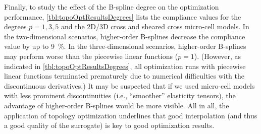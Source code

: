 Finally, to study the effect of the B-spline degree on the
optimization performance,
\cref{tbl:topoOptResultsDegrees} lists the compliance values
for the degrees $p = 1, 3, 5$ and the 2D/3D cross and sheared cross
micro-cell models.
In the two-dimensional scenarios,
higher-order B-splines decrease the compliance value
by up to \SI{9}{\percent}.
In the three-dimensional scenarios,
higher-order B-splines may perform worse than the piecewise linear
functions ($p = 1$).
(However, as indicated in \cref{tbl:topoOptResultsDegrees},
all optimization runs with piecewise linear functions
terminated prematurely due to numerical difficulties with the
discontinuous derivatives.)
It may be suspected that if we used micro-cell models with
less prominent discontinuities (i.e., ``smoother'' elasticity tensors),
the advantage of higher-order B-splines would be more visible.
All in all, the application of topology optimization underlines
that good interpolation (and thus a good quality of the surrogate)
is key to good optimization results.

